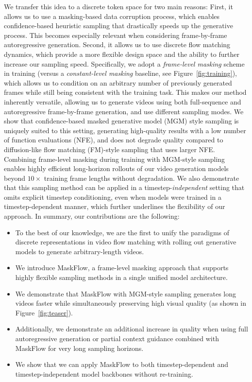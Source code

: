 We transfer this idea to a discrete token space for two main reasons: First, it allows us to use a masking-based data corruption process, which enables confidence-based heuristic sampling that drastically speeds up the generative process. This becomes especially relevant when considering frame-by-frame autoregressive generation. Second, it allows us to use discrete flow matching dynamics, which provide a more flexible design space and the ability to further increase our sampling speed. Specifically, we adopt a \emph{frame-level masking} scheme in training (versus a \emph{constant-level masking} baseline, see Figure~\ref{fig:training}), which allows us to condition on an arbitrary number of previously generated frames while still being consistent with the training task. This makes our method inherently versatile, allowing us to generate videos using both full-sequence and autoregressive frame-by-frame generation, and use different sampling modes. We show that confidence-based masked generative model (MGM) style sampling is uniquely suited to this setting, generating high-quality results with a low number of function evaluations (NFE), and does not degrade quality compared to diffusion-like flow matching (FM)-style sampling that uses larger NFE. 
Combining frame-level masking during training with MGM-style sampling enables highly efficient long-horizon rollouts of our video generation models beyond $10 \times$ training frame lengths without degradation. We also demonstrate that this sampling method can be applied in a timestep-\emph{independent} setting that omits explicit timestep conditioning, even when models were trained in a timestep-dependent manner, which further underlines the flexibility of our approach. In summary, our contributions are the following:

\begin{itemize}
    \item To the best of our knowledge, we are the first to unify the paradigms of discrete representations in video flow matching with rolling out generative models to generate arbitrary-length videos. 
    \item We introduce MaskFlow, a frame-level masking approach that supports highly flexible sampling methods in a single unified model architecture.
    \item We demonstrate that MaskFlow with MGM-style sampling generates long videos faster while simultaneously preserving high visual quality (as shown in Figure~\ref{fig:teaser}).
    \item Additionally, we demonstrate an additional increase in quality when using full autoregressive generation or partial context guidance combined with MaskFlow for very long sampling horizons.
    \item We show that we can apply MaskFlow to both timestep-dependent and timestep-independent model backbones without re-training.
\end{itemize}

